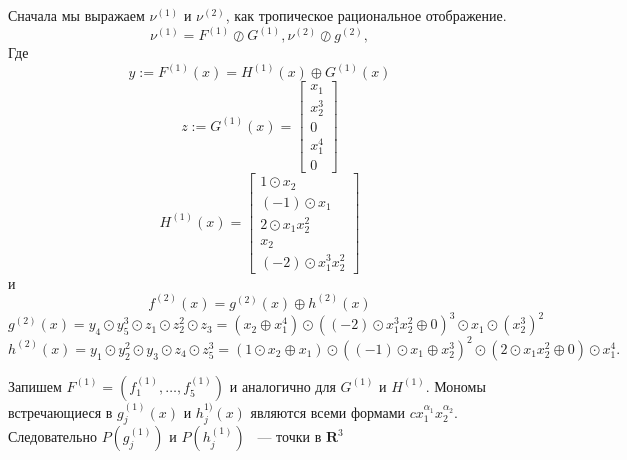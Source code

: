 \documentclass[russian]{lecture-notes}
\begin{document}
	Сначала мы выражаем $\nu^{(1)}$ и $\nu^{(2)}$, как тропическое рациональное отображение.
	\[
	\nu^{(1)}=F^{(1)}\oslash G^{(1)} , \nu^{(2)} \oslash g^{(2)},
	\]
	Где 
	\[
		y:=F^{(1)}(x) = H^{(1)}(x) \oplus G^{(1)}(x)
	\]
	\[
		z:=G^{(1)}(x) = \begin{bmatrix}
		x_1\\
		x_2^3\\
		0\\
		x_1^4\\
		0
		\end{bmatrix}
	\]
	\[
		H^{(1)}(x) = \begin{bmatrix}
		1\odot x_2\\
		(-1)\odot x_1\\
		2 \odot x_1x^2_2\\
		x_2\\
		(-2)\odot x_1^3 x^2_2
		\end{bmatrix}
	\]
	и 
	\[
		f^{(2)}(x) = g^{(2)}(x) \oplus h^{(2)}(x)
	\]
	\[
		g^{(2)}(x) = y_4 \odot y_5^3 \odot z_1 \odot z_2^2 \odot z_3 = (x_2 \oplus x^4_1) \odot ((-2)\odot x^3_1x^2_2 \oplus 0)^3 \odot x_1 \odot (x_2^3)^2
	\]
	\[
		h^{(2)}(x) = y_1 \odot y_2^2 \odot y_3 \odot z_4 \odot z_5^3 = (1 \odot x_2 \oplus x_1)\odot ((-1)\odot x_1 \oplus x^3_2)^2 \odot (2 \odot x_1x_2^2 \oplus 0) \odot x_1^4.
	\]
	\begin{figure}[h]
	
	\end{figure}
	Запишем $F^{(1)} = (f_1^{(1)}, \dots, f_5^{(1)})$ и аналогично для $G^{(1)}$ и $H^{(1)}$. Мономы встречающиеся в $g_j^{(1)}(x)$ и $h_j^{1)}(x)$ являются всеми формами $cx_1^{\alpha_1}x_2^{\alpha_2}$. Следовательно $P(g_j^{(1)})$ и $P(h_j^{(1)})$ ~--- точки в $\mathbf{R}^3$
	
\end{document}
